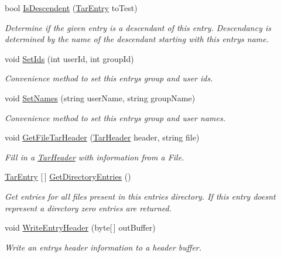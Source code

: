 \begin{DoxyCompactItemize}
bool \hyperlink{class_i_c_sharp_code_1_1_sharp_zip_lib_1_1_tar_1_1_tar_entry_a35b68e2b14c520f4ab7f3fc1fa900e66}{Is\+Descendent} (\hyperlink{class_i_c_sharp_code_1_1_sharp_zip_lib_1_1_tar_1_1_tar_entry}{Tar\+Entry} to\+Test)
\begin{DoxyCompactList}\small\item\em Determine if the given entry is a descendant of this entry. Descendancy is determined by the name of the descendant starting with this entry\textquotesingle{}s name. \end{DoxyCompactList}\item 
void \hyperlink{class_i_c_sharp_code_1_1_sharp_zip_lib_1_1_tar_1_1_tar_entry_a35b323fe98b260560de910f216d9f04c}{Set\+Ids} (int user\+Id, int group\+Id)
\begin{DoxyCompactList}\small\item\em Convenience method to set this entry\textquotesingle{}s group and user ids. \end{DoxyCompactList}\item 
void \hyperlink{class_i_c_sharp_code_1_1_sharp_zip_lib_1_1_tar_1_1_tar_entry_a374c8399fc9caed499f93e7369132012}{Set\+Names} (string user\+Name, string group\+Name)
\begin{DoxyCompactList}\small\item\em Convenience method to set this entry\textquotesingle{}s group and user names. \end{DoxyCompactList}\item 
void \hyperlink{class_i_c_sharp_code_1_1_sharp_zip_lib_1_1_tar_1_1_tar_entry_adedc3f6f9db85bb537943eedbd32a660}{Get\+File\+Tar\+Header} (\hyperlink{class_i_c_sharp_code_1_1_sharp_zip_lib_1_1_tar_1_1_tar_header}{Tar\+Header} header, string file)
\begin{DoxyCompactList}\small\item\em Fill in a \hyperlink{class_i_c_sharp_code_1_1_sharp_zip_lib_1_1_tar_1_1_tar_header}{Tar\+Header} with information from a File. \end{DoxyCompactList}\item 
\hyperlink{class_i_c_sharp_code_1_1_sharp_zip_lib_1_1_tar_1_1_tar_entry}{Tar\+Entry} \mbox{[}$\,$\mbox{]} \hyperlink{class_i_c_sharp_code_1_1_sharp_zip_lib_1_1_tar_1_1_tar_entry_a828b43a3b22aea55b0a8a7f3de0b6b3b}{Get\+Directory\+Entries} ()
\begin{DoxyCompactList}\small\item\em Get entries for all files present in this entries directory. If this entry doesnt represent a directory zero entries are returned. \end{DoxyCompactList}\item 
void \hyperlink{class_i_c_sharp_code_1_1_sharp_zip_lib_1_1_tar_1_1_tar_entry_ae6dca6749b1c6e3a75b66d62e3401084}{Write\+Entry\+Header} (byte\mbox{[}$\,$\mbox{]} out\+Buffer)
\begin{DoxyCompactList}\small\item\em Write an entry\textquotesingle{}s header information to a header buffer. \end{DoxyCompactList}\end{DoxyCompactItemize}
